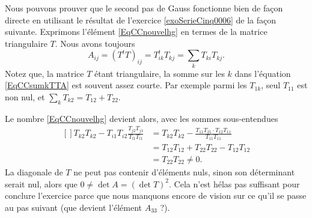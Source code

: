 \begin{remark}
	
	Nous pouvons prouver que le second pas de Gauss fonctionne bien de façon directe en utilisant le résultat de l'exercice \ref{exoSerieCinq0006} de la façon suivante. Exprimons l'élément \eqref{EqCCnouvelhg} en termes de la matrice triangulaire $T$. Nous avons toujours
	\begin{equation}		\label{EqCCsumkTTA}
		A_{ij}=(T^tT)_{ij}=T^t_{ik}T_{kj}=\sum_kT_{ki}T_{kj}.
	\end{equation}
	Notez que, la matrice $T$ étant triangulaire, la somme sur les $k$ dans l'équation \eqref{EqCCsumkTTA} est souvent assez courte. Par exemple parmi les $T_{1k}$, seul $T_{11}$ est non nul, et $\sum_kT_{k2}=T_{12}+T_{22}$.

	Le nombre \eqref{EqCCnouvelhg} devient alors, avec les sommes sous-entendues
	\begin{equation}
		\begin{aligned}[]
			T_{k2}T_{k2}-T_{i1}T_{i2}\frac{ T_{j2}T_{j1} }{ T_{l1}T_{l1} }&=T_{k2}T_{k2}-\frac{ T_{11}T_{21}\cdot T_{12}T_{11} }{ T_{11}T_{11} }\\
				&=T_{12}T_{12}+T_{22}T_{22}-T_{12}T_{12}\\
				&=T_{22}T_{22}\neq0.
		\end{aligned}
	\end{equation}
	La diagonale de $T$ ne peut pas contenir d'éléments nuls, sinon son déterminant serait nul, alors que $0\neq\det A=(\det T)^2$. Cela n'est hélas pas suffisant pour conclure l'exercice parce que nous manquons encore de vision sur ce qu'il se passe au pas suivant (que devient l'élément $A_{33}$ ?). 

\end{remark}
